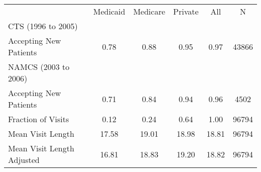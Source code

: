 \begin{tabular}{lccccc} \toprule
            &    Medicaid&    Medicare&     Private&         All&           N\\
CTS (1996 to 2005)&            &            &            &            &            \\
\hspace{4mm} Accepting New Patients&        0.78&        0.88&        0.95&        0.97&       43866\\
NAMCS (2003 to 2006)&            &            &            &            &            \\
\hspace{4mm} Accepting New Patients&        0.71&        0.84&        0.94&        0.96&        4502\\
\hspace{4mm} Fraction of Visits &        0.12&        0.24&        0.64&        1.00&       96794\\
\hspace{4mm} Mean Visit Length      &       17.58&       19.01&       18.98&       18.81&       96794\\
\hspace{4mm} Mean Visit Length Adjusted  &       16.81&       18.83&       19.20&       18.82&       96794\\
\bottomrule \end{tabular}
